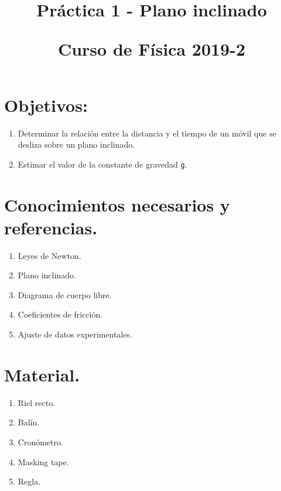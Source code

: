 
\title{Práctica 1 - Plano inclinado \\ \begin{Large}Curso de Física 2019-2\end{Large}}
\setlength{\voffset}{-1cm}

\maketitle
\vspace*{-3cm} 
\fontsize{14}{14}\selectfont
\section{Objetivos:}
\begin{enumerate}
\item Determinar la relación entre la distancia y el tiempo de un móvil que se desliza sobre un plano inclinado.
\item Estimar el valor de la constante de gravedad \texttt{g}.
\end{enumerate}
\section{Conocimientos necesarios y referencias.}
\begin{multicols}{2}
\begin{enumerate}[label=\roman*.]
\itemsep-1em 
\item  Leyes de Newton. \\
\item Plano inclinado. \\
\item  Diagrama de cuerpo libre. \\
\item  Coeficientes de fricción. \\
\item  Ajuste de datos experimentales.
\end{enumerate}
\end{multicols}
\section{Material.}
\begin{multicols}{2}
\begin{enumerate}[label=\alph*.]
\itemsep0em 
\item Riel recto.
\item Balín.
\item Cronómetro.
\item Masking tape.
\item Regla.
\end{enumerate}
\end{multicols}
